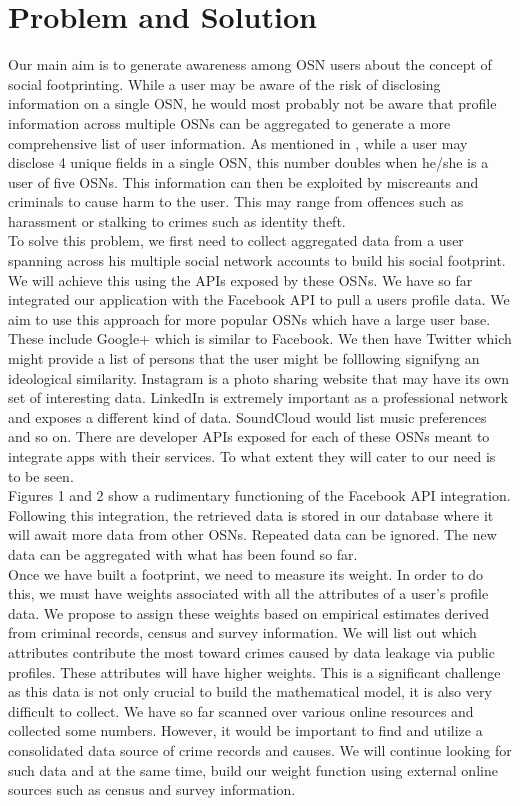 \documentclass[12pt,conference]{IEEEtran}
\begin{document}
\section{Problem and Solution}
Our main aim is to generate awareness among OSN users about the concept of social footprinting. While a user may be aware of the risk of disclosing information on a single OSN, he would most probably not be aware that profile information across multiple OSNs can be aggregated to generate a more comprehensive list of user information. As mentioned in \cite{emergingthreat}, while a user may disclose 4 unique fields in a single OSN, this number doubles when he/she is a user of five OSNs. This information can then be exploited by miscreants and criminals to cause harm to the user. This may range from offences such as harassment or stalking to crimes such as identity theft. \\

To solve this problem, we first need to collect aggregated data from a user spanning across his multiple social network accounts to build his social footprint. We will achieve this using the APIs exposed by these OSNs. We have so far integrated our application with the Facebook API to pull a users profile data. We aim to use this approach for more popular OSNs which have a large user base. These include Google+ which is similar to Facebook. We then have Twitter which might provide a list of persons that the user might be folllowing signifyng an ideological similarity. Instagram is a photo sharing website that may have its own set of interesting data. LinkedIn is extremely important as a professional network and exposes a different kind of data. SoundCloud would list music preferences and so on. There are developer APIs exposed for each of these OSNs meant to integrate apps with their services. To what extent they will cater to our need is to be seen.\\

Figures 1 and 2 show a rudimentary functioning of the Facebook API integration. Following this integration, the retrieved data is stored in our database where it will await more data from other OSNs. Repeated data can be ignored. The new data can be aggregated with what has been found so far.\\

Once we have built a footprint, we need to measure its weight. In order to do this, we must have weights associated with all the attributes of a user's profile data. We propose to assign these weights based on empirical estimates derived from criminal records, census and survey information. We will list out which attributes contribute the most toward crimes caused by data leakage via public profiles. These attributes will have higher weights. This is a significant challenge as this data is not only crucial to build the mathematical model, it is also very difficult to collect. We have so far scanned over various online resources and collected some numbers. However, it would be important to find and utilize a consolidated data source of crime records and causes. We will continue looking for such data and at the same time, build our weight function using external online sources such as census and survey information.\\
\end{document}
